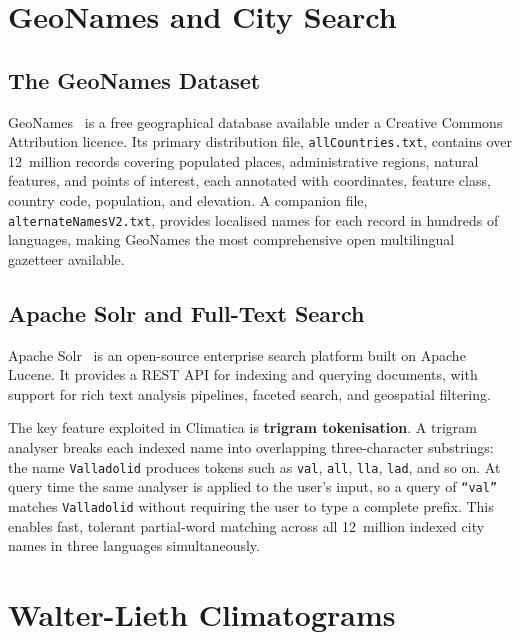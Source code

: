 
\section{GeoNames and City Search}\label{REL_GEONAMES}

\subsection{The GeoNames Dataset}\label{REL_GEONAMES_DATA}

GeoNames~\cite{geonames} is a free geographical database available under a
Creative Commons Attribution licence. Its primary distribution file,
\texttt{allCountries.txt}, contains over 12~million records covering populated
places, administrative regions, natural features, and points of interest,
each annotated with coordinates, feature class, country code, population,
and elevation. A companion file, \texttt{alternateNamesV2.txt}, provides
localised names for each record in hundreds of languages, making GeoNames
the most comprehensive open multilingual gazetteer available.

\subsection{Apache Solr and Full-Text Search}\label{REL_GEONAMES_SOLR}

Apache Solr~\cite{apache_solr} is an open-source enterprise search platform
built on Apache Lucene. It provides a REST API for indexing and querying
documents, with support for rich text analysis pipelines, faceted search, and
geospatial filtering.

The key feature exploited in Climatica is \textbf{trigram tokenisation}. A
trigram analyser breaks each indexed name into overlapping three-character
substrings: the name \texttt{Valladolid} produces tokens such as
\texttt{val}, \texttt{all}, \texttt{lla}, \texttt{lad}, and so on. At query
time the same analyser is applied to the user's input, so a query of
\texttt{``val''} matches \texttt{Valladolid} without requiring the user to type
a complete prefix. This enables fast, tolerant partial-word matching across all
12~million indexed city names in three languages simultaneously.


\section{Walter-Lieth Climatograms}\label{REL_WL}

